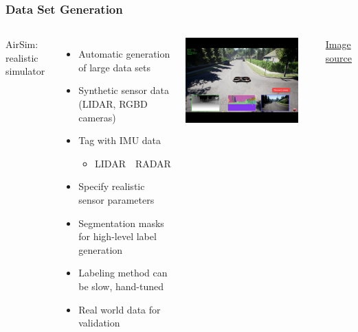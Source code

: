 \documentclass[aspectratio=169]{rubeamer}
\newif\ifpause
\newcommand{\mypause}{\ifpause \pause \fi}
\begin{document}
\begin{frame}
  \frametitle{Data Set Generation}
  \begin{columns}
      AirSim: realistic simulator
      \begin{itemize}
        \item Automatic generation of large data sets
        \mypause
        \item Synthetic sensor data (LIDAR, RGBD cameras)
        \mypause
        \item Tag with IMU data
        \mypause
        \begin{itemize}
          \item LIDAR~\textrightarrow~RADAR
        \end{itemize}
        \mypause
        \item Specify realistic sensor parameters
        \mypause
        \item Segmentation masks for high-level label generation
        \mypause
        \item Labeling method can be slow, hand-tuned
        \mypause
        \item Real world data for validation
      \end{itemize}
      \onslide
      \includegraphics[width=0.9\textwidth]{airsim}

      \href{https://mspoweruser.com/microsoft-launches-aerial-informatics-and-robotics-platform-to-help-developers-build-autonomous-systems/}{\color{blue}Image source}
    \centering
  \end{columns}
\end{frame}
\end{document}
